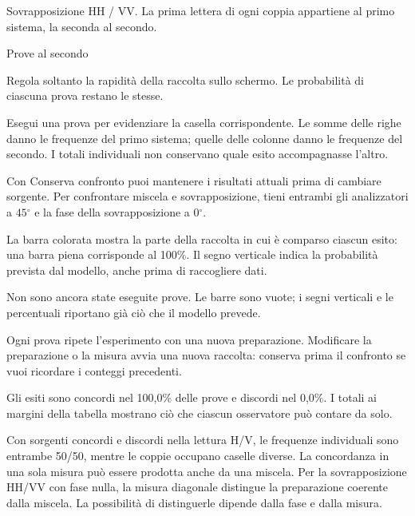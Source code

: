 Sovrapposizione HH / VV. La prima lettera di ogni coppia appartiene al primo sistema, la seconda al secondo.\par

Prove al secondo\par

Regola soltanto la rapidità della raccolta sullo schermo. Le probabilità di ciascuna prova restano le stesse.\par

Esegui una prova per evidenziare la casella corrispondente. Le somme delle righe danno le frequenze del primo sistema; quelle delle colonne danno le frequenze del secondo. I totali individuali non conservano quale esito accompagnasse l'altro.\par

Con \guillemotleft{}Conserva confronto\guillemotright{} puoi mantenere i risultati attuali prima di cambiare sorgente. Per confrontare miscela e sovrapposizione, tieni entrambi gli analizzatori a \(45{}^{\circ} \) e la fase della sovrapposizione a \(0{}^{\circ} \).\par

La barra colorata mostra la parte della raccolta in cui è comparso ciascun esito: una barra piena corrisponde al 100\%. Il segno verticale indica la probabilità prevista dal modello, anche prima di raccogliere dati.\par

Non sono ancora state eseguite prove. Le barre sono vuote; i segni verticali e le percentuali riportano già ciò che il modello prevede.\par

Ogni prova ripete l'esperimento con una nuova preparazione. Modificare la preparazione o la misura avvia una nuova raccolta: conserva prima il confronto se vuoi ricordare i conteggi precedenti.\par


Gli esiti sono concordi nel 100,0\% delle prove e discordi nel 0,0\%. I totali ai margini della tabella mostrano ciò che ciascun osservatore può contare da solo.\par

Con sorgenti concordi e discordi nella lettura H/V, le frequenze individuali sono entrambe 50/50, mentre le coppie occupano caselle diverse. La concordanza in una sola misura può essere prodotta anche da una miscela. Per la sovrapposizione HH/VV con fase nulla, la misura diagonale distingue la preparazione coerente dalla miscela. La possibilità di distinguerle dipende dalla fase e dalla misura.\par

